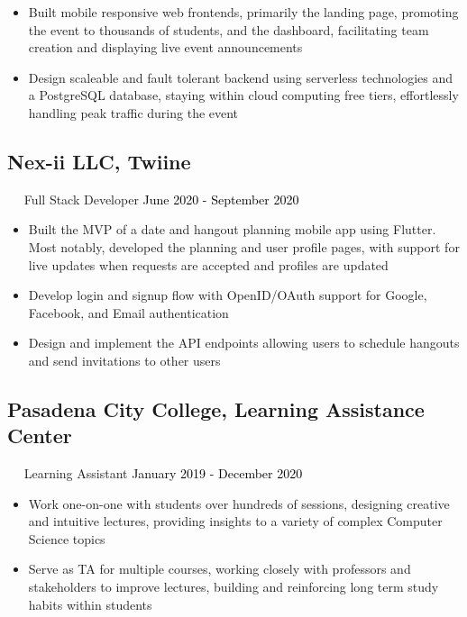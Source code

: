 \documentclass{article}
\newcommand{\resumesection}[3]{
    \subsection*{#1}
    \ 
    \ 
    \small
    \textcolor{csufgrey}{#2}
    \normalsize
    \hfill
    \textcolor{black}{#3}
    \normalsize
}
\begin{document}
\begin{itemize}
    \item Built mobile responsive web frontends, primarily the landing page, promoting the event to thousands of students, and the dashboard, facilitating team creation and displaying live event announcements
    \item Design scaleable and fault tolerant backend using serverless technologies and a PostgreSQL database, staying within cloud computing free tiers, effortlessly handling peak traffic during the event
\end{itemize}
\resumesection{Nex-ii LLC, Twiine}{Full Stack Developer}{June 2020 - September 2020}
\begin{itemize}
    \item Built the MVP of a date and hangout planning mobile app using Flutter. Most notably, developed the planning and user profile pages, with support for live updates when requests are accepted and profiles are updated
    \item Develop login and signup flow with OpenID/OAuth support for Google, Facebook, and Email authentication
    \item Design and implement the API endpoints allowing users to schedule hangouts and send invitations to other users
\end{itemize}
\resumesection{Pasadena City College, Learning Assistance Center}{Learning Assistant}{January 2019 - December 2020}
\begin{itemize}
    \item Work one-on-one with students over hundreds of sessions, designing creative and intuitive lectures, providing insights to a variety of complex Computer Science topics
    \item Serve as TA for multiple courses, working closely with professors and stakeholders to improve lectures, building and reinforcing long term study habits within students
\end{itemize}
\end{document}
